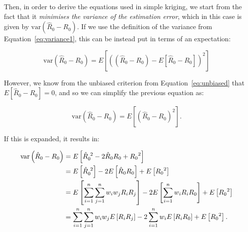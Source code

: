 

Then, in order to derive the equations used in simple kriging, we start from the fact that it \emph{minimises the variance of the estimation error}, which in this case is given by \(\mathrm{var}\left(\hat{R}_0 - R_0\right)\).
If we use the definition of the variance from Equation~\ref{eq:variance1}, this can be instead put in terms of an expectation:

\begin{equation}
\mathrm{var}\left(\hat{R}_0 - R_0\right) = E \left[ \left( \left(\hat{R}_0 - R_0\right) - E \left[\hat{R}_0 - R_0\right] \right)^2 \right] \nonumber
\end{equation}

However, we know from the unbiased criterion from Equation~\ref{eq:unbiased} that \(E\left[ \hat{R}_0 - R_0 \right] = 0\), and so we can simplify the previous equation as:

\begin{equation}
\mathrm{var}\left(\hat{R}_0 - R_0\right) = E\left[\left( \hat{R}_0 - R_0 \right)^2\right] \nonumber.
\end{equation}

If this is expanded, it results in:

\begin{align}
\mathrm{var}\left(\hat{R}_0 - R_0\right) &= E\left[{\hat{R}_0}^{\hspace{1.2mm}2} - 2\hat{R}_0R_0 + {R_0}^2 \right] \nonumber \\
&= E\left[{\hat{R}_0}^{\hspace{1.2mm}2}\right] - 2E\left[\hat{R}_0R_0\right] + E\left[{R_0}^2 \right] \nonumber \\
&= E\left[\sum_{i=1}^n \sum_{j=1}^n w_i w_j R_i R_j\right] - 2E\left[\sum_{i=1}^n w_i R_i R_0\right] + E\left[{R_0}^2 \right] \nonumber \\
&= \sum_{i=1}^n \sum_{j=1}^n w_i w_j E\left[R_i R_j\right] - 2\sum_{i=1}^n w_i E\left[R_i R_0\right] + E\left[{R_0}^2 \right]. \nonumber
\end{align}

